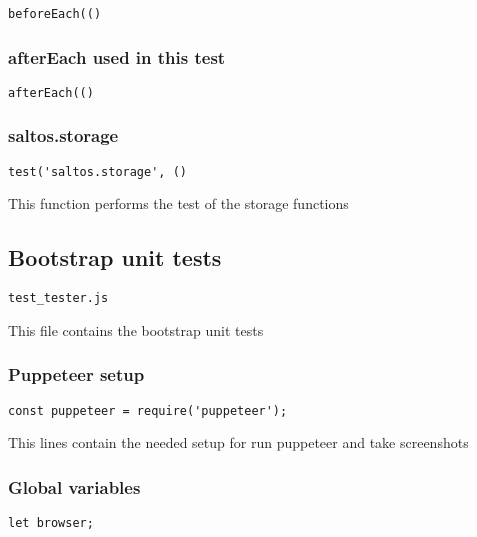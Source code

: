 \documentclass[a4paper]{article}
\begin{document}
\begin{lstlisting}
beforeEach(()
\end{lstlisting}

\hypertarget{toc695}{}
\subsubsection{afterEach used in this test}

\begin{lstlisting}
afterEach(()
\end{lstlisting}

\hypertarget{toc696}{}
\subsubsection{saltos.storage}

\begin{lstlisting}
test('saltos.storage', ()
\end{lstlisting}

This function performs the test of the storage functions

\hypertarget{toc697}{}
\subsection{Bootstrap unit tests}

\begin{lstlisting}
test_tester.js
\end{lstlisting}

This file contains the bootstrap unit tests

\hypertarget{toc698}{}
\subsubsection{Puppeteer setup}

\begin{lstlisting}
const puppeteer = require('puppeteer');
\end{lstlisting}

This lines contain the needed setup for run puppeteer and take screenshots

\hypertarget{toc699}{}
\subsubsection{Global variables}

\begin{lstlisting}
let browser;
\end{lstlisting}
\end{document}

